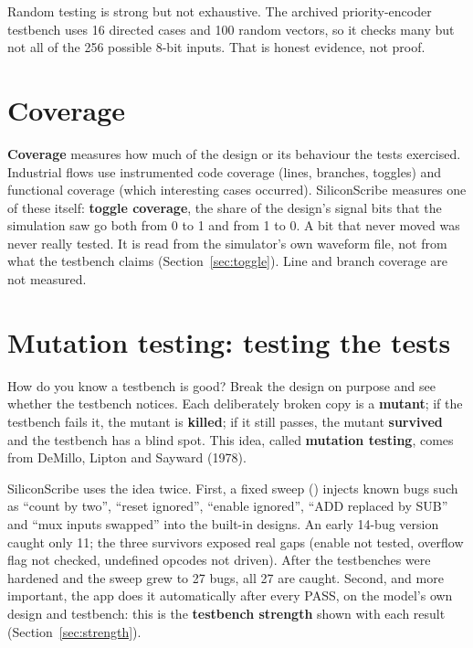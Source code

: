 \begin{warnbox}
Random testing is strong but not exhaustive. The archived priority-encoder testbench uses 16 directed cases and 100 random vectors, so it checks many but not all of the 256 possible 8-bit inputs. That is honest evidence, not proof.
\end{warnbox}

\section{Coverage}

\textbf{Coverage} measures how much of the design or its behaviour the tests exercised. Industrial flows use instrumented code coverage (lines, branches, toggles) and functional coverage (which interesting cases occurred). SiliconScribe measures one of these itself: \textbf{toggle coverage}, the share of the design's signal bits that the simulation saw go both from 0 to 1 and from 1 to 0. A bit that never moved was never really tested. It is read from the simulator's own waveform file, not from what the testbench claims (Section~\ref{sec:toggle}). Line and branch coverage are not measured.

\section{Mutation testing: testing the tests}
\label{sec:mutation}

How do you know a testbench is good? Break the design on purpose and see whether the testbench notices. Each deliberately broken copy is a \textbf{mutant}; if the testbench fails it, the mutant is \textbf{killed}; if it still passes, the mutant \textbf{survived} and the testbench has a blind spot. This idea, called \textbf{mutation testing}, comes from DeMillo, Lipton and Sayward (1978).

SiliconScribe uses the idea twice. First, a fixed sweep () injects known bugs such as ``count by two'', ``reset ignored'', ``enable ignored'', ``ADD replaced by SUB'' and ``mux inputs swapped'' into the built-in designs. An early 14-bug version caught only 11; the three survivors exposed real gaps (enable not tested, overflow flag not checked, undefined opcodes not driven). After the testbenches were hardened and the sweep grew to 27 bugs, all 27 are caught. Second, and more important, the app does it automatically after every PASS, on the model's own design and testbench: this is the \textbf{testbench strength} shown with each result (Section~\ref{sec:strength}).

